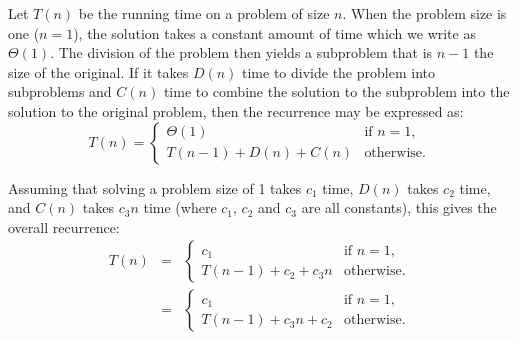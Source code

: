 Let $T(n)$ be the running time on a problem of size $n$. When the problem size is one ($n = 1$), the solution takes a constant amount of time which we write as $\Theta(1)$. The division of the problem then yields a subproblem that is $n - 1$ the size of the original. If it takes $D(n)$ time to divide the problem into subproblems and $C(n)$ time to combine the solution to the subproblem into the solution to the original problem, then the recurrence may be expressed as:
\begin{equation*}
	T(n) = \left\{
	       \begin{array}{ll}
		\Theta(1) & \text{if } n = 1, \\
		T(n - 1) + D(n) + C(n) & \text{otherwise}.
	\end{array} \right.
\end{equation*}

Assuming that solving a problem size of 1 takes $c_1$ time, $D(n)$ takes $c_2$ time, and $C(n)$ takes $c_3 n$ time (where $c_1$, $c_2$ and $c_3$ are all constants), this gives the overall recurrence:
\begin{eqnarray*}
	T(n) & = & \left\{
	       \begin{array}{ll}
		c_1 & \text{if } n = 1, \\
		T(n - 1) + c_2 + c_3 n & \text{otherwise}.
	\end{array} \right. \\
	 & = & \left\{
	       \begin{array}{ll}
		c_1 & \text{if } n = 1, \\
		T(n - 1) + c_3 n + c_2 & \text{otherwise}.
	\end{array} \right.
\end{eqnarray*}
